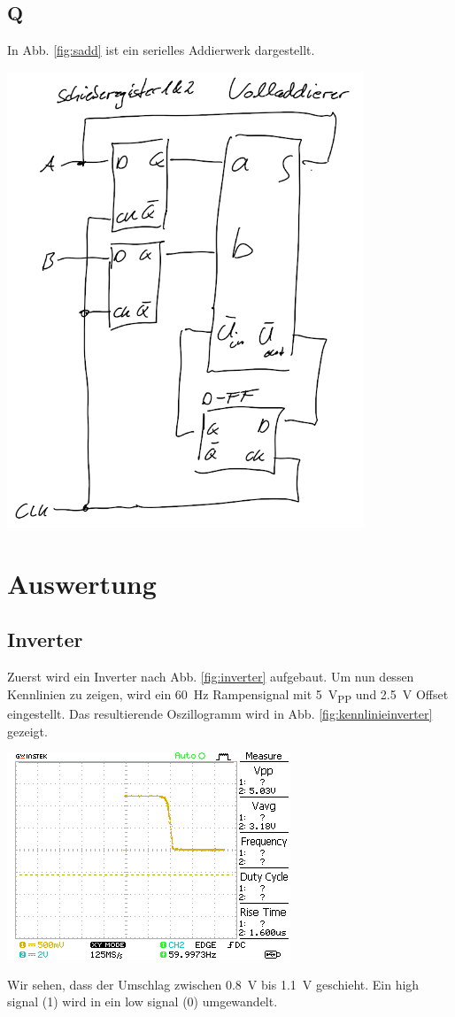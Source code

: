 \documentclass[10pt]{article}
\newenvironment{Figure}
  {\par\medskip\noindent\minipage{\linewidth}}
  {\endminipage\par\medskip}
\begin{document}
\begin{multicols}{2}
	\subsection*{Q}
	In Abb. \ref{fig:sadd} ist ein serielles Addierwerk dargestellt.
	\begin{Figure}
		\centering
		\includegraphics[width=0.8\textwidth]{serielles_addierwerk.png}
		\label{fig:sadd}
	\end{Figure}
	\section{Auswertung}
	\subsection{Inverter}
	Zuerst wird ein Inverter nach Abb. \ref{fig:inverter} aufgebaut. Um nun dessen Kennlinien zu zeigen, wird ein \SI{60}{Hz} Rampensignal mit \SI{5}{V_{PP}} und \SI{2.5}{V} Offset eingestellt. Das resultierende Oszillogramm wird in Abb. \ref{fig:kennlinieinverter} gezeigt.
	\begin{Figure}
		\centering\includegraphics{../data/DS0003.png}
		\label{fig:kennlinieinverter}
	\end{Figure}
	Wir sehen, dass der Umschlag zwischen \SI{0.8}{V} bis \SI{1.1}{V} geschieht. Ein high signal (1) wird in ein low signal (0) umgewandelt.

\end{multicols}
\end{document}

